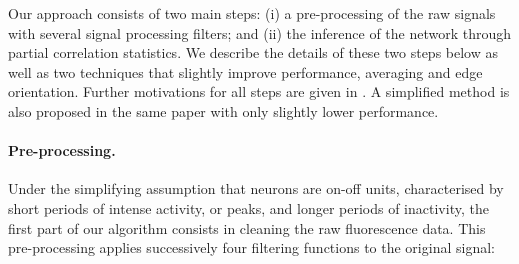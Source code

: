 \documentclass[wcp]{jmlr}
\begin{document}
Our approach consists of two main steps: (i) a pre-processing of the raw
signals with several signal processing filters; and (ii) the inference of the
network through partial correlation statistics. We describe the details of
these two steps below as well as two techniques that slightly improve
performance, averaging and edge orientation. Further motivations for all steps
are given in \citep{sutera2014simple}. A simplified method is also proposed in
the same paper with only slightly lower performance.

\paragraph{Pre-processing.}

Under the simplifying assumption that neurons are on-off units, characterised
by short periods of intense activity, or peaks, and longer periods of
inactivity, the first part of our algorithm consists in cleaning the raw
fluorescence data. This pre-processing applies successively four
filtering functions to the original signal:
\end{document}

